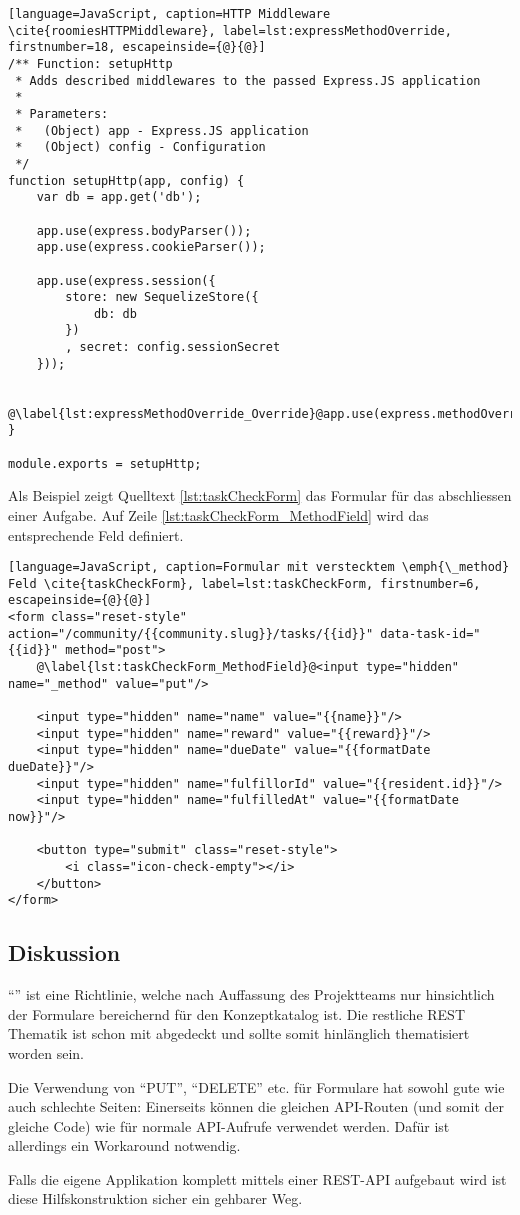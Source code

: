 \begin{lstlisting}[language=JavaScript, caption=HTTP Middleware \cite{roomiesHTTPMiddleware}, label=lst:expressMethodOverride, firstnumber=18, escapeinside={@}{@}]
/** Function: setupHttp
 * Adds described middlewares to the passed Express.JS application
 *
 * Parameters:
 *   (Object) app - Express.JS application
 *   (Object) config - Configuration
 */
function setupHttp(app, config) {
	var db = app.get('db');

	app.use(express.bodyParser());
	app.use(express.cookieParser());

	app.use(express.session({
		store: new SequelizeStore({
			db: db
		})
		, secret: config.sessionSecret
	}));

	@\label{lst:expressMethodOverride_Override}@app.use(express.methodOverride());
}

module.exports = setupHttp;
\end{lstlisting}

Als Beispiel zeigt Quelltext \ref{lst:taskCheckForm} das Formular für das abschliessen einer Aufgabe. Auf Zeile \ref{lst:taskCheckForm_MethodField} wird das entsprechende Feld definiert.

\begin{lstlisting}[language=JavaScript, caption=Formular mit verstecktem \emph{\_method} Feld \cite{taskCheckForm}, label=lst:taskCheckForm, firstnumber=6, escapeinside={@}{@}]
<form class="reset-style" action="/community/{{community.slug}}/tasks/{{id}}" data-task-id="{{id}}" method="post">
	@\label{lst:taskCheckForm_MethodField}@<input type="hidden" name="_method" value="put"/>

	<input type="hidden" name="name" value="{{name}}"/>
	<input type="hidden" name="reward" value="{{reward}}"/>
	<input type="hidden" name="dueDate" value="{{formatDate dueDate}}"/>
	<input type="hidden" name="fulfillorId" value="{{resident.id}}"/>
	<input type="hidden" name="fulfilledAt" value="{{formatDate now}}"/>

	<button type="submit" class="reset-style">
		<i class="icon-check-empty"></i>
	</button>
</form>
\end{lstlisting}

\subsection*{Diskussion}

``'' ist eine Richtlinie, welche nach Auffassung des Projektteams nur hinsichtlich der Formulare bereichernd für den Konzeptkatalog ist. Die restliche \gls{REST} Thematik ist schon mit  abgedeckt und sollte somit hinlänglich thematisiert worden sein.

Die Verwendung von ``PUT'', ``DELETE'' etc. für Formulare hat sowohl gute wie auch schlechte Seiten: Einerseits können die gleichen API-Routen (und somit der gleiche Code) wie für normale API-Aufrufe verwendet werden. Dafür ist allerdings ein Workaround notwendig.

Falls die eigene Applikation komplett mittels einer \gls{REST}-API aufgebaut wird ist diese Hilfskonstruktion sicher ein gehbarer Weg.